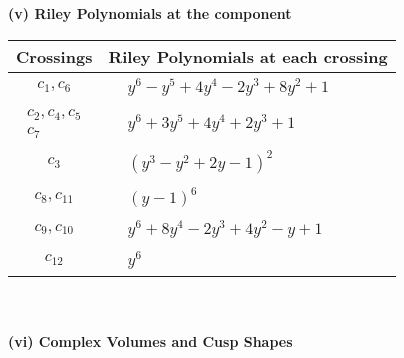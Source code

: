 \documentclass[1p]{elsarticle_modified}
\theoremstyle{definition}
\begin{document}
\newpage\renewcommand{\arraystretch}{1}
\flushleft \textbf{(v) Riley Polynomials at the component}\newline \\
\begin{tabular}{m{50pt}|m{274pt}}
Crossings & \hspace{64pt}Riley Polynomials at each crossing \\
\hline $$\begin{aligned}c_{1},c_{6}\end{aligned}$$&$\begin{aligned}
&y^6- y^5+4 y^4-2 y^3+8 y^2+1
\end{aligned}$\\
\hline $$\begin{aligned}c_{2},c_{4},c_{5}\\c_{7}\end{aligned}$$&$\begin{aligned}
&y^6+3 y^5+4 y^4+2 y^3+1
\end{aligned}$\\
\hline $$\begin{aligned}c_{3}\end{aligned}$$&$\begin{aligned}
&(y^3- y^2+2 y-1)^2
\end{aligned}$\\
\hline $$\begin{aligned}c_{8},c_{11}\end{aligned}$$&$\begin{aligned}
&(y-1)^6
\end{aligned}$\\
\hline $$\begin{aligned}c_{9},c_{10}\end{aligned}$$&$\begin{aligned}
&y^6+8 y^4-2 y^3+4 y^2- y+1
\end{aligned}$\\
\hline $$\begin{aligned}c_{12}\end{aligned}$$&$\begin{aligned}
&y^6
\end{aligned}$\\
\hline
\end{tabular}\\~\\
\newpage\flushleft \textbf{(vi) Complex Volumes and Cusp Shapes}
\end{document}

